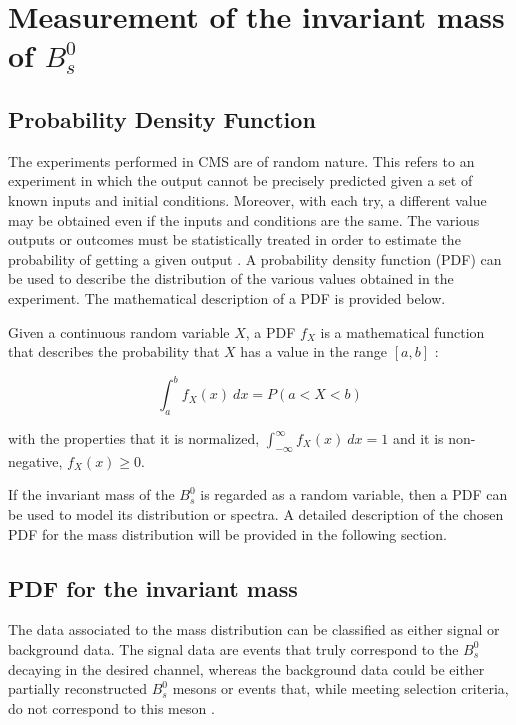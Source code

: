 \chapter[\leavevmode\newline Measurement of the invariant mass of $B^0_s$]{Measurement of the invariant mass of $B^0_s$}
\label{chap:Chapter_4}
\section{Probability Density Function}
The experiments performed in CMS are of random nature. This refers to an experiment in which the output cannot be precisely predicted given a set of known inputs and initial conditions. Moreover, with each try, a different value may be obtained even if the inputs and conditions are the same. The various outputs or outcomes must be statistically treated in order to estimate the probability of getting a given output \cite{vsirca2016probability}. A probability density function (PDF) can be used to describe the distribution of the various values obtained in the experiment. The mathematical description of a PDF is provided below.

Given a continuous random variable $X$, a PDF $f_X$ is a mathematical function that describes the probability that $X$ has a value in the range $[a, b]$ \cite{bragagnolo2021measurement, vsirca2016probability}:

\begin{equation}
	\int_{a}^{b} f_X(x) \ dx = P(a < X < b)
\end{equation}

with the properties that it is normalized, $\int_{-\infty}^{\infty} f_X(x) \ dx = 1$ and it is non-negative, $f_X(x) \geq 0$.

If the invariant mass of the $B^0_s$ is regarded as a random variable, then a PDF can be used to model its distribution or spectra. A detailed description of the chosen PDF for the mass distribution will be provided in the following section.
\section{PDF for the invariant mass}
The data associated to the mass distribution can be classified as either signal or background data. The signal data are events that truly correspond to the $B^0_s$ decaying in the desired channel, whereas the background data could be either partially reconstructed $B^0_s$ mesons or events that, while meeting selection criteria, do not correspond to this meson \cite{mejia2012medida}.

